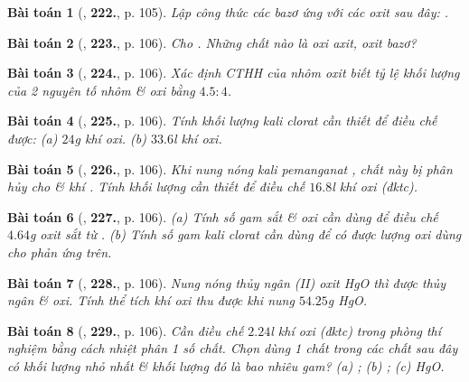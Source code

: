 \documentclass{article}
\numberwithin{equation}{section}
\newtheorem{baitoan}{Bài toán}
\begin{document}
\begin{baitoan}[\cite{An_400_BT_Hoa_Hoc_8_2020}, \textbf{222.}, p. 105]
	Lập công thức các bazơ ứng với các oxit sau đây: \emph{}.
\end{baitoan}

\begin{baitoan}[\cite{An_400_BT_Hoa_Hoc_8_2020}, \textbf{223.}, p. 106]
	Cho \emph{}. Những chất nào là oxi axit, oxit bazơ?
\end{baitoan}

\begin{baitoan}[\cite{An_400_BT_Hoa_Hoc_8_2020}, \textbf{224.}, p. 106]
	Xác định CTHH của nhôm oxit biết tỷ lệ khối lượng của 2 nguyên tố nhôm \& oxi bằng $4.5:4$.
\end{baitoan}

\begin{baitoan}[\cite{An_400_BT_Hoa_Hoc_8_2020}, \textbf{225.}, p. 106]
	Tính khối lượng kali clorat cần thiết để điều chế được: (a) $24$\emph{g} khí oxi. (b) $33.6$\emph{l} khí oxi.
\end{baitoan}

\begin{baitoan}[\cite{An_400_BT_Hoa_Hoc_8_2020}, \textbf{226.}, p. 106]
	Khi nung nóng kali pemanganat \emph{}, chất này bị phân hủy cho \emph{} \& khí \emph{}. Tính khối lượng \emph{} cần thiết để điều chế $16.8$\emph{l} khí oxi (đktc). 
\end{baitoan}

\begin{baitoan}[\cite{An_400_BT_Hoa_Hoc_8_2020}, \textbf{227.}, p. 106]
	(a) Tính số gam sắt \& oxi cần dùng để điều chế $4.64$\emph{g} oxit sắt từ \emph{}. (b) Tính số gam kali clorat \emph{} cần dùng để có được lượng oxi dùng cho phản ứng trên.
\end{baitoan}

\begin{baitoan}[\cite{An_400_BT_Hoa_Hoc_8_2020}, \textbf{228.}, p. 106]
	Nung nóng thủy ngân (II) oxit \emph{HgO} thì được thủy ngân \& oxi. Tính thể tích khí oxi thu được khi nung $54.25$\emph{g} \emph{HgO}.
\end{baitoan}

\begin{baitoan}[\cite{An_400_BT_Hoa_Hoc_8_2020}, \textbf{229.}, p. 106]
	Cần điều chế $2.24$\emph{l} khí oxi (đktc) trong phòng thí nghiệm bằng cách nhiệt phân 1 số chất. Chọn dùng 1 chất trong các chất sau đây có khối lượng nhỏ nhất \& khối lượng đó là bao nhiêu gam? (a) \emph{}; (b) \emph{}; (c) \emph{HgO}.
\end{baitoan}
\end{document}
